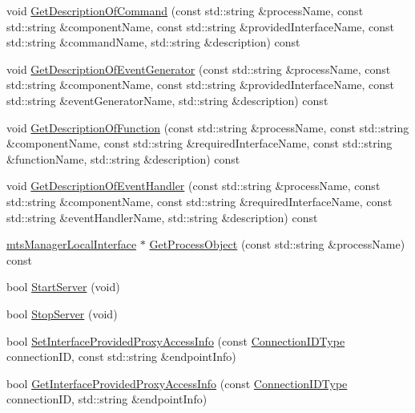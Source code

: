 \begin{DoxyCompactItemize}
\item 
void \hyperlink{classmts_manager_global_a6ce2a921e276e66e7fa993a209eca493}{Get\+Description\+Of\+Command} (const std\+::string \&process\+Name, const std\+::string \&component\+Name, const std\+::string \&provided\+Interface\+Name, const std\+::string \&command\+Name, std\+::string \&description) const 
\item 
void \hyperlink{classmts_manager_global_a940ee93980abe9f06c3bff805c5b638a}{Get\+Description\+Of\+Event\+Generator} (const std\+::string \&process\+Name, const std\+::string \&component\+Name, const std\+::string \&provided\+Interface\+Name, const std\+::string \&event\+Generator\+Name, std\+::string \&description) const 
\item 
void \hyperlink{classmts_manager_global_ad69f9c7dba89ec7528bf4a1effbaaf92}{Get\+Description\+Of\+Function} (const std\+::string \&process\+Name, const std\+::string \&component\+Name, const std\+::string \&required\+Interface\+Name, const std\+::string \&function\+Name, std\+::string \&description) const 
\item 
void \hyperlink{classmts_manager_global_a6b01678cac68950588380cc576e8b856}{Get\+Description\+Of\+Event\+Handler} (const std\+::string \&process\+Name, const std\+::string \&component\+Name, const std\+::string \&required\+Interface\+Name, const std\+::string \&event\+Handler\+Name, std\+::string \&description) const 
\item 
\hyperlink{classmts_manager_local_interface}{mts\+Manager\+Local\+Interface} $\ast$ \hyperlink{classmts_manager_global_a345d1abcd9982e1ddf1c0dbb1e9a26c3}{Get\+Process\+Object} (const std\+::string \&process\+Name) const 
\item 
bool \hyperlink{classmts_manager_global_a6e0773b090ddded56d7bdb57ad61658d}{Start\+Server} (void)
\item 
bool \hyperlink{classmts_manager_global_a815cf7a0880ba63b00bd79a06a564601}{Stop\+Server} (void)
\item 
bool \hyperlink{classmts_manager_global_a27ab6be87f292f862b05551bf786bcfd}{Set\+Interface\+Provided\+Proxy\+Access\+Info} (const \hyperlink{mts_forward_declarations_8h_ad3543bb11742e1766374ec96016d6547}{Connection\+I\+D\+Type} connection\+I\+D, const std\+::string \&endpoint\+Info)
\item 
bool \hyperlink{classmts_manager_global_a5b746df511febca8caca1482341f1595}{Get\+Interface\+Provided\+Proxy\+Access\+Info} (const \hyperlink{mts_forward_declarations_8h_ad3543bb11742e1766374ec96016d6547}{Connection\+I\+D\+Type} connection\+I\+D, std\+::string \&endpoint\+Info)

\end{DoxyCompactItemize}
